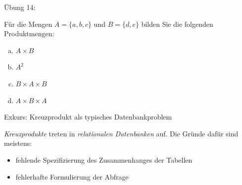 \documentclass[12pt,ngerman,a4paper,ignorenonframetext,]{beamer}
\providecommand{\tightlist}{%
  \setlength{\itemsep}{0pt}\setlength{\parskip}{0pt}}
\begin{document}
\begin{frame}{Übung 14:}
\protect\hypertarget{ubung-14}{}

Für die Mengen \(A=\{a, b, c\}\) und \(B=\{d, e\}\) bilden Sie die
folgenden Produktmengen:

\begin{enumerate}
[a)]
\tightlist
\item
  \(\displaystyle A \times B\)
\item
  \(\displaystyle A^2\)
\item
  \(\displaystyle B \times A \times B\)
\item
  \(\displaystyle A \times B \times A\)
\end{enumerate}

\note{}

\end{frame}

\begin{frame}{Exkurs: Kreuzprodukt als typisches Datenbankproblem}
\protect\hypertarget{exkurs-kreuzprodukt-als-typisches-datenbankproblem}{}

\emph{Kreuzprodukte} treten in \emph{relationalen Datenbanken} auf. Die
Gründe dafür sind meistens:

\begin{itemize}
\tightlist
\item
  fehlende Spezifizierung des Zusammenhanges der Tabellen
\item
  fehlerhafte Formulierung der Abfrage
\end{itemize}

\end{frame}
\end{document}
